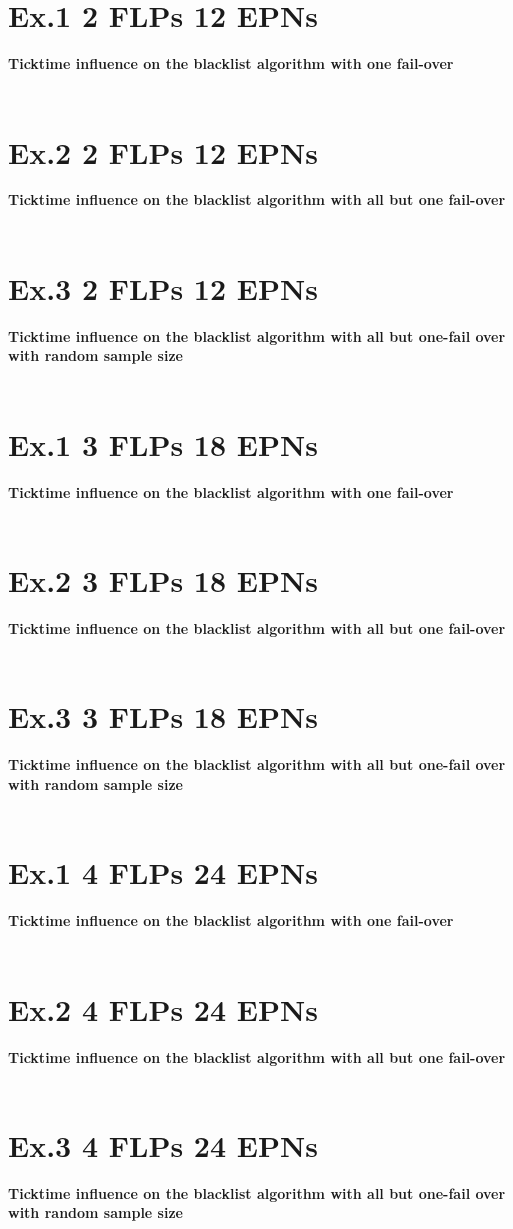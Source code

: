\section{Ex.1 2 FLPs 12 EPNs}
\textbf{Ticktime influence on the blacklist algorithm with one fail-over}
\\\\

\section{Ex.2 2 FLPs 12 EPNs}
\textbf{Ticktime influence on the blacklist algorithm with all but one fail-over}
\\\\

\section{Ex.3 2 FLPs 12 EPNs}
\textbf{Ticktime influence on the blacklist algorithm with all but one-fail over with random sample size}
\\\\

\section{Ex.1 3 FLPs 18 EPNs}
\textbf{Ticktime influence on the blacklist algorithm with one fail-over}
\\\\

\section{Ex.2 3 FLPs 18 EPNs}
\textbf{Ticktime influence on the blacklist algorithm with all but one fail-over}
\\\\

\section{Ex.3 3 FLPs 18 EPNs}
\textbf{Ticktime influence on the blacklist algorithm with all but one-fail over with random sample size}
\\\\

\section{Ex.1 4 FLPs 24 EPNs}
\textbf{Ticktime influence on the blacklist algorithm with one fail-over}
\\\\

\section{Ex.2 4 FLPs 24 EPNs}
\textbf{Ticktime influence on the blacklist algorithm with all but one fail-over}
\\\\

\section{Ex.3 4 FLPs 24 EPNs}
\textbf{Ticktime influence on the blacklist algorithm with all but one-fail over with random sample size}
\\\\

